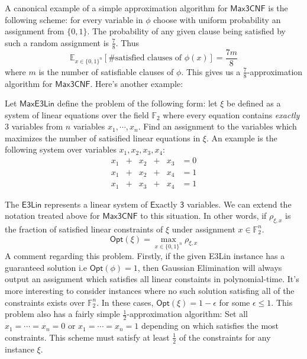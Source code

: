 A canonical example of a simple approximation algorithm for $\mathsf{Max3CNF}$ is the following scheme: for every variable in $\phi$ choose with uniform probability an assignment from $\{0,1\}$. The probability of any given clause being satisfied by such a random assignment is $\frac{7}{8}$. Thus
%
\[ \mathbb{E}_{x \in \{0,1\}^n}[\text{\# satisfied clauses of $\phi(x)$}] = \frac{7m}{8} \]
%
where $m$ is the number of satisfiable clauses of $\phi$. This gives us a $\frac{7}{8}$-approximation algorithm for $\mathsf{Max3CNF}$. Here's another example:
%
\begin{example} \label{e3linexample}
  Let $\mathsf{MaxE3Lin}$ define the problem of the following form: let $\xi$ be defined as a system of linear equations over the field $\mathbb{F}_2$ where every equation contains \emph{exactly} $3$ variables from $n$ variables $x_1,\cdots,x_n$. Find an assignment to the variables which maximizes the number of satisified linear equations in $\xi$. An example is the following system over variables $x_1,x_2,x_3,x_4$:
  \begin{equation*}
    \begin{alignedat}{3}
      x_1 & +{} &  x_2 & +{} & x_3 & = 0 \\
      x_1 & +{} &  x_2 & +{} &  x_4 & = 1 \\
      x_1 & +{} & x_3 & +{} & x_4 & = 1
\end{alignedat}
\end{equation*}
\end{example}
%
The $\mathsf{E3Lin}$ represents a linear system of $\mathsf{E}$xactly $\mathsf{3}$ variables. We can extend the notation treated above for $\mathsf{Max3CNF}$ to this situation. In other words, if $\rho_{\xi,x}$ is the fraction of satisfied linear constraints of $\xi$ under assignment $x \in \mathbb{F}_2^n$.
%
\[\mathsf{Opt}(\xi) =\max_{x \in \{0,1\}^n}\rho_{\xi,x}\]
%
A comment regarding this problem. Firstly, if the given E3Lin instance has a guaranteed solution i.e $\mathsf{Opt}(\phi) = 1$, then Gaussian Elimination will always output an assignment which satisfies all linear constaints in polynomial-time. It's more interesting to consider instances where no such solution satisfing all of the constraints exists over $\mathbb{F}_2^n$. In these cases, $\mathsf{Opt}(\xi) = 1 - \epsilon$ for some $\epsilon \leq 1$. This problem also has a fairly simple $\frac{1}{2}$-approximation algorithm: Set all $x_1 = \cdots = x_n  = 0$ or $x_1 = \cdots = x_n  = 1$ depending on which satisfies the most constraints. This scheme must satisfy at least $\frac{1}{2}$ of the constraints for any instance $\xi$. \newline

